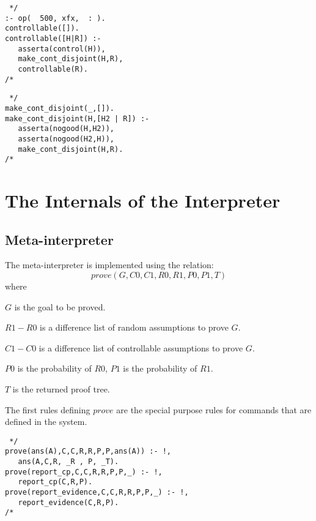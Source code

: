 \documentclass[11pt,fleqn]{article}
\begin{document}
\begin{verbatim} */
:- op(  500, xfx,  : ).
controllable([]).
controllable([H|R]) :-
   asserta(control(H)),
   make_cont_disjoint(H,R),
   controllable(R).
/* \end{verbatim}
\begin{verbatim} */
make_cont_disjoint(_,[]).
make_cont_disjoint(H,[H2 | R]) :-
   asserta(nogood(H,H2)),
   asserta(nogood(H2,H)),
   make_cont_disjoint(H,R).
/* \end{verbatim}

\section{The Internals of the Interpreter}
\subsection{Meta-interpreter}
The meta-interpreter is implemented using the relation:
\[prove(G,C0,C1,R0,R1,P0,P1,T)\]
where
\begin{description}
\item $G$ is the goal to be proved.
\item $R1-R0$ is a difference list of random assumptions to prove $G$.
\item $C1-C0$ is a difference list of controllable assumptions to prove $G$.
\item $P0$ is the probability of $R0$, $P1$ is the probability of $R1$.
\item $T$ is the returned proof tree.
\end{description}
The first rules defining $prove$ are the special purpose rules
for commands that are defined in the system.
\begin{verbatim} */
prove(ans(A),C,C,R,R,P,P,ans(A)) :- !,
   ans(A,C,R, _R , P, _T).
prove(report_cp,C,C,R,R,P,P,_) :- !,
   report_cp(C,R,P).
prove(report_evidence,C,C,R,R,P,P,_) :- !,
   report_evidence(C,R,P).
/* \end{verbatim}
\end{document}
